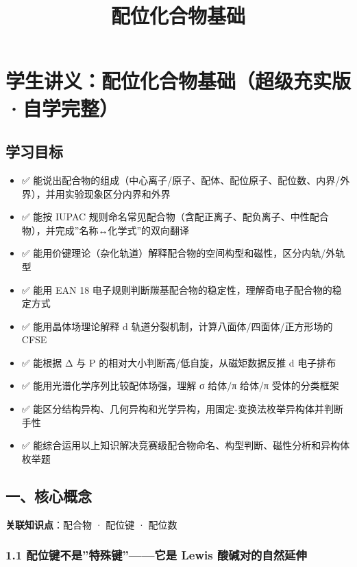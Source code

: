\documentclass[a4paper,11pt]{ctexart}
\title{配位化合物基础}
\date{}
\providecommand{\tightlist}{\setlength{\itemsep}{0pt}\setlength{\parskip}{0pt}}
\begin{document}
\maketitle
\tableofcontents
\newpage

\section{学生讲义：配位化合物基础（超级充实版·自学完整）}\label{ux5b66ux751fux8bb2ux4e49ux914dux4f4dux5316ux5408ux7269ux57faux7840ux8d85ux7ea7ux5145ux5b9eux7248ux81eaux5b66ux5b8cux6574}

\subsection{学习目标}\label{ux5b66ux4e60ux76eeux6807}

\begin{itemize}
\tightlist
\item
  ✅ 能说出配合物的组成（中心离子/原子、配体、配位原子、配位数、内界/外界），并用实验现象区分内界和外界
\item
  ✅ 能按 IUPAC 规则命名常见配合物（含配正离子、配负离子、中性配合物），并完成''名称↔化学式''的双向翻译
\item
  ✅ 能用价键理论（杂化轨道）解释配合物的空间构型和磁性，区分内轨/外轨型
\item
  ✅ 能用 EAN 18 电子规则判断羰基配合物的稳定性，理解奇电子配合物的稳定方式
\item
  ✅ 能用晶体场理论解释 d 轨道分裂机制，计算八面体/四面体/正方形场的 CFSE
\item
  ✅ 能根据 Δ 与 P 的相对大小判断高/低自旋，从磁矩数据反推 d 电子排布
\item
  ✅ 能用光谱化学序列比较配体场强，理解 σ 给体/π 给体/π 受体的分类框架
\item
  ✅ 能区分结构异构、几何异构和光学异构，用固定-变换法枚举异构体并判断手性
\item
  ✅ 能综合运用以上知识解决竞赛级配合物命名、构型判断、磁性分析和异构体枚举题
\end{itemize}

\subsection{一、核心概念}\label{ux4e00ux6838ux5fc3ux6982ux5ff5}

\textbf{关联知识点}：配合物 · 配位键 · 配位数

\subsubsection{1.1 配位键不是''特殊键''------它是 Lewis 酸碱对的自然延伸}\label{ux914dux4f4dux952eux4e0dux662fux7279ux6b8aux952eux5b83ux662f-lewis-ux9178ux78b1ux5bf9ux7684ux81eaux7136ux5ef6ux4f38}
\end{document}
